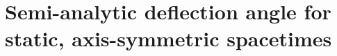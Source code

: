 \section{Semi-analytic deflection angle for static, axis-symmetric spacetimes}
\label{appendix:deflection-angle}

